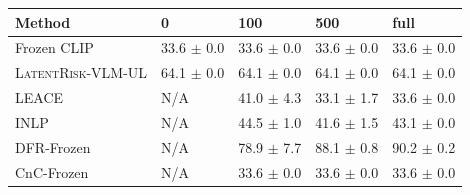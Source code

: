 \begin{tabular}{lllll}
\toprule
Method & 0 & 100 & 500 & full \\
\midrule
Frozen CLIP & 33.6 $\pm$ 0.0 & 33.6 $\pm$ 0.0 & 33.6 $\pm$ 0.0 & 33.6 $\pm$ 0.0 \\
\textsc{LatentRisk-VLM}-UL & 64.1 $\pm$ 0.0 & 64.1 $\pm$ 0.0 & 64.1 $\pm$ 0.0 & 64.1 $\pm$ 0.0 \\
LEACE & N/A & 41.0 $\pm$ 4.3 & 33.1 $\pm$ 1.7 & 33.6 $\pm$ 0.0 \\
INLP & N/A & 44.5 $\pm$ 1.0 & 41.6 $\pm$ 1.5 & 43.1 $\pm$ 0.0 \\
DFR-Frozen & N/A & 78.9 $\pm$ 7.7 & 88.1 $\pm$ 0.8 & 90.2 $\pm$ 0.2 \\
CnC-Frozen & N/A & 33.6 $\pm$ 0.0 & 33.6 $\pm$ 0.0 & 33.6 $\pm$ 0.0 \\
\bottomrule
\end{tabular}
